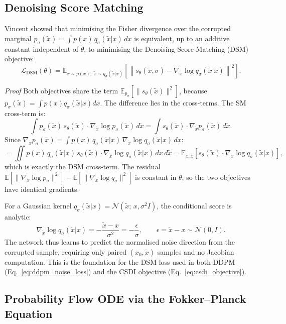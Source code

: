 \subsection{Denoising Score Matching}
\label{app:subsec:dsm}

Vincent \cite{vincent2011connection} showed that minimising the Fisher divergence
over the corrupted marginal $p_\sigma(\tilde{x}) = \int p(x)\,q_\sigma(\tilde{x}
|x)\,dx$ is equivalent, up to an additive constant independent of $\theta$, to
minimising the Denoising Score Matching (DSM) objective:
\[
    \mathcal{L}_{\text{DSM}}(\theta)
    = \mathbb{E}_{x \sim p(x),\;\tilde{x} \sim q_\sigma(\tilde{x}|x)}
    \!\left[\left\|s_\theta(\tilde{x},\sigma)
    - \nabla_{\tilde{x}}\log q_\sigma(\tilde{x}|x)\right\|^2\right].
\]

\textit{Proof} Both objectives share the term $\mathbb{E}_{p_\sigma}
[\|s_\theta(\tilde{x})\|^2]$, because $p_\sigma(\tilde{x}) = \int p(x)
q_\sigma(\tilde{x}|x)dx$. The difference lies in the cross-terms. The SM
cross-term is:
\[
    \int p_\sigma(\tilde{x})\,s_\theta(\tilde{x})\cdot
    \nabla_{\tilde{x}}\log p_\sigma(\tilde{x})\,d\tilde{x}
    = \int s_\theta(\tilde{x})\cdot\nabla_{\tilde{x}} p_\sigma(\tilde{x})\,d\tilde{x}.
\]
Since $\nabla_{\tilde{x}} p_\sigma(\tilde{x})
= \int p(x)\,q_\sigma(\tilde{x}|x)\,\nabla_{\tilde{x}}\log q_\sigma(\tilde{x}|x)\,dx$:
\[
    = \iint p(x)\,q_\sigma(\tilde{x}|x)\,s_\theta(\tilde{x})
    \cdot\nabla_{\tilde{x}}\log q_\sigma(\tilde{x}|x)\,dx\,d\tilde{x}
    = \mathbb{E}_{x,\tilde{x}}\!\left[s_\theta(\tilde{x})
    \cdot\nabla_{\tilde{x}}\log q_\sigma(\tilde{x}|x)\right],
\]
which is exactly the DSM cross-term. The residual $\mathbb{E}[\|\nabla_{\tilde{x}}
\log p_\sigma\|^2] - \mathbb{E}[\|\nabla_{\tilde{x}}\log q_\sigma\|^2]$ is
constant in $\theta$, so the two objectives have identical gradients.

For a Gaussian kernel $q_\sigma(\tilde{x}|x)=\mathcal{N}(\tilde{x};\,x,
\sigma^2 I)$, the conditional score is analytic:
\[
    \nabla_{\tilde{x}}\log q_\sigma(\tilde{x}|x)
    = -\frac{\tilde{x} - x}{\sigma^2}
    = -\frac{\epsilon}{\sigma}, \qquad
    \epsilon = \tilde{x} - x \sim \mathcal{N}(0, I).
\]
The network thus learns to predict the normalised noise direction from the
corrupted sample, requiring only paired $(x_0, \tilde{x})$ samples and no
Jacobian computation. This is the foundation for the DSM loss used in both
DDPM (Eq.\ \ref{eq:ddpm_noise_loss}) and the CSDI objective
(Eq.\ \ref{eq:csdi_objective}).

\subsection{Probability Flow ODE via the Fokker--Planck Equation}
\label{app:subsec:fp_ode}

